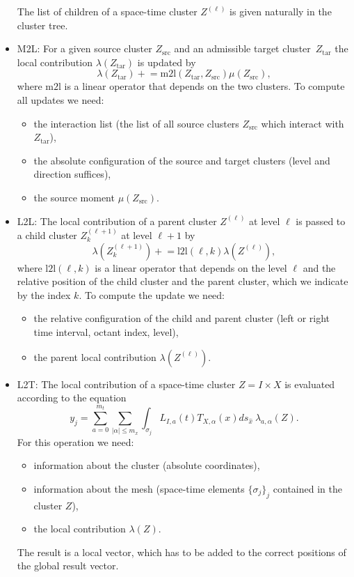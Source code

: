 \documentclass[a4paper,11pt]{article}
\theoremstyle{plain}
\theoremstyle{definition}
\theoremstyle{remark}
\newcommand{\pluseq}{\mathrel{+}=}
\begin{document}
\begin{itemize}
\begin{itemize}
    \end{itemize}
    The list of children of a space-time cluster $Z^{(\ell)}$ is given naturally in the cluster tree.
  \item M2L: For a given source cluster $Z_{\mathrm{src}}$ and an admissible target cluster~$Z_{\mathrm{tar}}$ the local
    contribution $\lambda(Z_{\mathrm{tar}})$ is updated by
    \begin{equation*}
      \lambda(Z_{\mathrm{tar}}) \pluseq \mathrm{m2l}(Z_{\mathrm{tar}}, Z_{\mathrm{src}}) \mu(Z_{\mathrm{src}}),
    \end{equation*}
    where $\mathrm{m2l}$ is a linear operator that depends on the two clusters. To compute all updates we need:
    \begin{itemize}
      \item the interaction list (the list of all source clusters $Z_{\mathrm{src}}$ which interact with 
      $Z_{\mathrm{tar}}$),
      \item the absolute configuration of the source and target clusters (level and direction suffices),
      \item the source moment $\mu(Z_{\mathrm{src}})$.
    \end{itemize}
  \item L2L: The local contribution of a parent cluster $Z^{(\ell)}$ at level $\ell$ is passed to a child cluster 
  $Z_{k}^{(\ell+1)}$ at level $\ell+1$ by
  \begin{equation*}
    \lambda(Z_{k}^{(\ell+1)}) \pluseq \mathrm{l2l}(\ell, k) \lambda(Z^{(\ell)}),
  \end{equation*}
  where $\mathrm{l2l}(\ell, k)$ is a linear operator that depends on the level $\ell$ and the relative position of
  the child cluster and the parent cluster, which we indicate by the index $k$. To compute the update we need:
  \begin{itemize}
    \item the relative configuration of the child and parent cluster (left or right time interval, octant index, level),
    \item the parent local contribution $\lambda(Z^{(\ell)})$.
  \end{itemize}
  \item L2T: The local contribution of a space-time cluster $Z = I \times X$ is evaluated according to the equation 
    \begin{equation*}
      y_j = \sum_{a=0}^{m_t} \sum_{|\alpha|\leq m_x} 
        \int_{\sigma_j} L_{I,a}(t) T_{X,\alpha}(x) ds_{\hat{x}}\ \lambda_{a, \alpha}(Z).
    \end{equation*}
    For this operation we need:
    \begin{itemize}
      \item information about the cluster (absolute coordinates),
      \item information about the mesh (space-time elements $\{\sigma_j\}_j$ contained in the cluster $Z$),
      \item the local contribution $\lambda(Z)$.
    \end{itemize}
    The result is a local vector, which has to be added to the correct positions of the global result vector.
\end{itemize}
\end{document}
